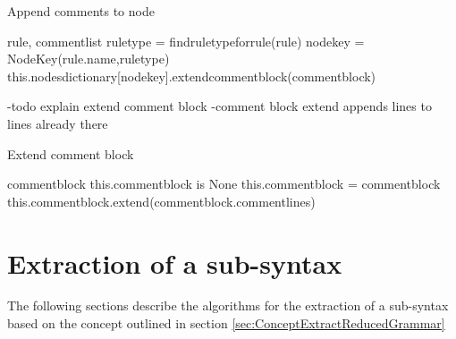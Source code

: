 \begin{algorithm}[H]
\small
\caption{Append comments to node}
\begin{algorithmic}[1]
\algrenewcommand\algorithmicindent{0.4em}
\Require rule, comment\textunderscore list
\State rule\textunderscore type = find\textunderscore rule\textunderscore type\textunderscore for\textunderscore rule(rule)
\State node\textunderscore key = Node\textunderscore Key(rule.name,rule\textunderscore type)
\State this.nodes\textunderscore dictionary[node\textunderscore key].extend\textunderscore comment\textunderscore block(comment\textunderscore block)
\end{algorithmic}
\label{alg:append_comment_to_node}
\end{algorithm}

-todo explain extend comment block
-comment block extend appends lines to lines already there
\begin{algorithm}[H]
\small
\caption{Extend comment block}
\begin{algorithmic}[1]
\algrenewcommand\algorithmicindent{0.4em}
\Require comment\textunderscore block
\If this.comment\textunderscore block is None
	\State this.comment\textunderscore block = comment\textunderscore block
\Else
	\State this.comment\textunderscore block.extend(comment\textunderscore block.comment\textunderscore lines)
\EndIf
\end{algorithmic}
\label{alg:extend_comment_block}
\end{algorithm}

\section{Extraction of a sub-syntax}\label{sec:ImplementationExtractReducedGrammar}
The following sections describe the algorithms for the extraction of a sub-syntax based on the concept outlined in section \ref{sec:ConceptExtractReducedGrammar}

